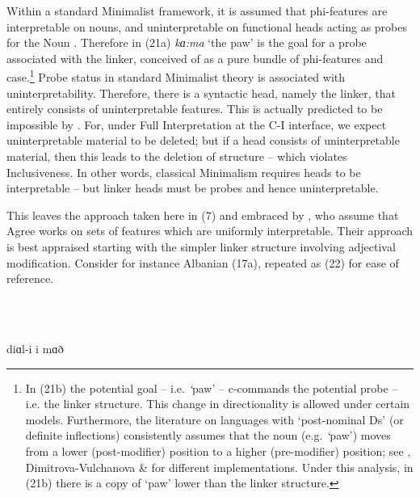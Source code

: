 \documentclass[output=paper]{langsci/langscibook}
\begin{document}
\begin{styleSfondomedioiColorexxi}
 Within a standard Minimalist framework, it is assumed that phi-features are interpretable on nouns, and uninterpretable on functional heads acting as probes for the Noun \citep{Carstens2001}. Therefore in (21a) \textit{kɑ}\textit{:ma} ‘the paw’ is the goal for a probe associated with the linker, conceived of as a pure bundle of phi-features and case.\footnote{In (21b) the potential goal – i.e. \textit{‘}paw’ – c-commands the potential probe – i.e. the linker structure. This change in directionality is allowed under certain models. Furthermore, the literature on languages with ‘post-nominal Ds’ (or definite inflections) consistently assumes that the noun (e.g. \textit{‘}paw’) moves from a lower (post-modifier) position to a higher (pre-modifier) position; see \citet{Turano2002}, Dimitrova-Vulchanova \& \citet{Giusti1998} for different implementations. Under this analysis, in (21b) there is a copy of ‘paw’ lower than the linker structure.} Probe status in standard Minimalist theory is associated with uninterpretability. Therefore, there is a syntactic head, namely the linker, that entirely consists of uninterpretable features. This is actually predicted to be impossible by \citet{Chomsky1995}. For, under Full Interpretation at the C-I interface, we expect uninterpretable material to be deleted; but if a head consists of uninterpretable material, then this leads to the deletion of structure – which violates Inclusiveness. In other words, classical Minimalism requires heads to be interpretable – but linker heads must be probes and hence uninterpretable. 
\end{styleSfondomedioiColorexxi}

\begin{styleSfondomedioiColorexxi}
  This leaves the approach taken here in (7) and embraced by \citet{FrancoEtAl2015}, who assume that Agree works on sets of features which are uniformly interpretable. Their approach is best appraised starting with the simpler linker structure involving adjectival modification. Consider for instance Albanian (17a), repeated as (22) for ease of reference. 
\end{styleSfondomedioiColorexxi}

\begin{styleSfondomedioiColorexxi}
\ea%
    \label{ex:key:22}
    \gll\\
        \\
    \glt
    \z

          diɑl-i       i   mɑð       
\end{styleSfondomedioiColorexxi}
\end{document}
